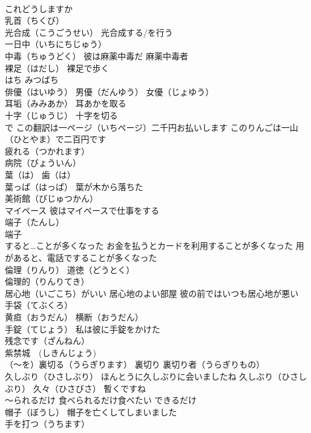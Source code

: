 \documentclass[8pt]{extreport}
\begin{document}
\begin{CJK}{UTF8}{min}
\\	これどうしますか
\\	乳首（ちくび）
\\	光合成（こうごうせい） 光合成する/を行う
\\	一日中（いちにちじゅう）
\\	中毒（ちゅうどく） 彼は麻薬中毒だ 麻薬中毒者
\\	裸足（はだし） 裸足で歩く
\\	はち みつばち
\\	俳優（はいゆう） 男優（だんゆう） 女優（じょゆう）
\\	耳垢（みみあか） 耳あかを取る
\\	十字（じゅうじ） 十字を切る
\\	で この翻訳は一ページ（いちページ）二千円お払いします このりんごは一山（ひとやま）で二百円です
\\	疲れる（つかれます）
\\	病院（びょういん）
\\	葉（は） 歯（は）
\\	葉っぱ（はっぱ） 葉が木から落ちた
\\	美術館（びじゅつかん）
\\	マイペース 彼はマイペースで仕事をする
\\	端子（たんし） 
\\	端子
\\	すると…ことが多くなった お金を払うとカードを利用することが多くなった 用があると、電話ですることが多くなった
\\	倫理（りんり） 道徳（どうとく）
\\	倫理的（りんりてき）
\\	居心地（いごこち）がいい 居心地のよい部屋 彼の前ではいつも居心地が悪い
\\	手袋（てぶくろ）
\\	黄疸（おうだん） 横断（おうだん）
\\	手錠（てじょう） 私は彼に手錠をかけた
\\	残念です（ざんねん）
\\	紫禁城　(しきんじょう)
\\	（～を）裏切る（うらぎります） 裏切り 裏切り者（うらぎりもの）
\\	久しぶり（ひさしぶり） ほんとうに久しぶりに会いましたね 久しぶり（ひさしぶり） 久々（ひさびさ） 暫くですね
\\	～られるだけ 食べられるだけ食べたい できるだけ
\\	帽子（ぼうし） 帽子を亡くしてしまいました
\\	手を打つ（うちます）

\end{CJK}
\end{document}

